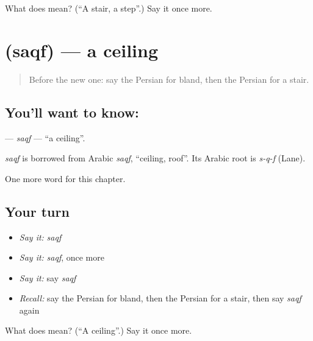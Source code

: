 \begin{tcolorbox}[breakable,colback=teal!4,colframe=teal!35!black,title={Before you move on}]
What does  mean? (\textquotedblleft{}A stair, a step\textquotedblright{}.) Say it once more.
\end{tcolorbox}
\section[\texorpdfstring{\fa{سقف} (saqf)}{سقف (saqf)}]{ (saqf) — a ceiling}

\label{lesson:FA-C203-saqf}



\begin{quote}
Before the new one: say the Persian for bland, then the Persian for a stair.
\end{quote}

\subsection*{You'll want to know: }
\textbf{} — \emph{saqf} — \textquotedblleft{}a ceiling\textquotedblright{}.

\begin{cousinweb}
\emph{saqf} is borrowed from Arabic \emph{saqf}, \textquotedblleft{}ceiling, roof\textquotedblright{}. Its Arabic root is \emph{s-q-f} (Lane).
\end{cousinweb}

\begin{grammarlens}[title={What you've built}]
One more word for this chapter.
\end{grammarlens}

\subsection*{Your turn}
\begin{itemize}
\raggedright
  \item \emph{Say it:} \emph{saqf}
  \item \emph{Say it:} \emph{saqf}, once more
  \item \emph{Say it:} say \emph{saqf}
  \item \emph{Recall:} say the Persian for bland, then the Persian for a stair, then say \emph{saqf} again
\end{itemize}

\begin{tcolorbox}[breakable,colback=teal!4,colframe=teal!35!black,title={Before you move on}]
What does  mean? (\textquotedblleft{}A ceiling\textquotedblright{}.) Say it once more.
\end{tcolorbox}
